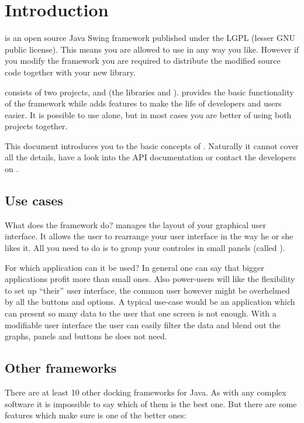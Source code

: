 \section{Introduction}
 is an open source Java Swing framework published under the LGPL (lesser GNU public license). This means you are allowed to use  in any way you like. However if you modify the framework you are required to distribute the modified source code together with your new library.

 consists of two projects,  and  (the libraries  and ).  provides the basic functionality of the framework while  adds features to make the life of developers and users easier. It is possible to use  alone, but in most cases you are better of using both projects together.

This document introduces you to the basic concepts of . Naturally it cannot cover all the details, have a look into the API documentation  or contact the developers on .

\subsection{Use cases}
What does the framework do?  manages the layout of your graphical user interface. It allows the user to rearrange your user interface in the way he or she likes it. All you need to do is to group your controles in small panels (called ).

For which application can it be used? In general one can say that bigger applications profit more than small ones. Also power-users will like the flexibility to set up ``their'' user interface, the common user however might be overhelmed by all the buttons and options. A typical use-case would be an application which can present so many data to the user that one screen is not enough. With a modifiable user interface the user can easily filter the data and blend out the graphs, panels and buttons he does not need.

\subsection{Other frameworks}
There are at least 10 other docking frameworks for Java. As with any complex software it is impossible to say which of them is the best one. But there are some features which make sure  is one of the better ones:

